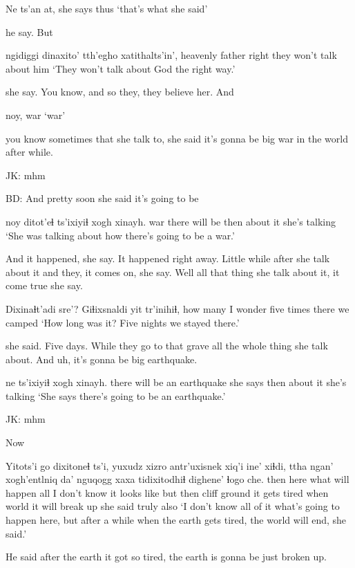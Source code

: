 \documentclass[12pt]{article}
\begin{document}
\gll Ne ts'an at, 
{she says} thus
\glt `that's what she said'
\glend

he say. But 

\gll ngidiggi dinaxito' tth'egho {xatithalts'in',} 
{heavenly} father   right  {they won't talk about him}
\glt `They won't talk about God the right way.'
\glend

she say. You know, and so they, they believe her. And 

\gll noy, 
war
\glt `war'
\glend

you know sometimes that she talk to, she said it's gonna be big war in
the world after while.  

JK:   mhm

BD:  And pretty soon she said it's going to be 

\gll noy ditot'eɬ      ts'ixiyiɬ xogh xinayh.
war {there will be} then    {about it}  {she's talking}
\glt `She was talking about how there's going to be a war.'
\glend

And it happened, she say. It happened right away.  Little while after
she talk about it and they, it comes on, she say.  Well all that thing
she talk about it, it come true she say.

\gll Dixinaɬt'adi    sre'?    Giɬixsnaldi yit   tr'inihiɬ, 
{how many}  {I wonder} {five times}  there {we camped}
\glt `How long was it? Five nights we stayed there.'
\glend

she said. Five days.  While they go to that grave all the whole thing
she talk about.  And uh, it's gonna be big earthquake.

             ne       ts'ixiyiɬ xogh xinayh.
{there will be an earthquake} {she says} then   {about it}  {she's talking}
\glt `She says there's going to be an earthquake.'
\glend

JK:  mhm

Now 

\gll Yitots'i go   dixitoneɬ ts'i, yuxudz xizro antr'uxisnek xiq'i ine' xiɬdi, ttha  ngan' xogh'entlniq      da'  {nguqogg}  {xaxa tidixitodhiɬ} dighene' ɬogo     che.
then     here {what will happen} {} all  {}   {I don't know}  {it looks like} but then  cliff ground {it gets tired}  when world        {it will break up}         {she said} truly also
\glt `I don't know all of it what's going to happen here, but after a while when the earth gets tired, the world will end, she said.'
\glend
                    
He said after the earth it got so tired, the earth is gonna be just broken up. 
\end{document}
